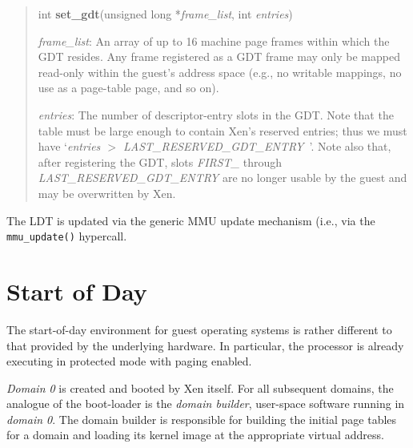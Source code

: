 \begin{quote}
  int {\bf set\_gdt}(unsigned long *{\em frame\_list}, int {\em
    entries})

  \emph{frame\_list}: An array of up to 16 machine page frames within
  which the GDT resides.  Any frame registered as a GDT frame may only
  be mapped read-only within the guest's address space (e.g., no
  writable mappings, no use as a page-table page, and so on).

  \emph{entries}: The number of descriptor-entry slots in the GDT.
  Note that the table must be large enough to contain Xen's reserved
  entries; thus we must have `{\em entries $>$
    LAST\_RESERVED\_GDT\_ENTRY}\ '.  Note also that, after registering
  the GDT, slots \emph{FIRST\_} through
  \emph{LAST\_RESERVED\_GDT\_ENTRY} are no longer usable by the guest
  and may be overwritten by Xen.
\end{quote}

The LDT is updated via the generic MMU update mechanism (i.e., via the
{\tt mmu\_update()} hypercall.

\section{Start of Day}

The start-of-day environment for guest operating systems is rather
different to that provided by the underlying hardware. In particular,
the processor is already executing in protected mode with paging
enabled.

{\it Domain 0} is created and booted by Xen itself. For all subsequent
domains, the analogue of the boot-loader is the {\it domain builder},
user-space software running in {\it domain 0}. The domain builder is
responsible for building the initial page tables for a domain and
loading its kernel image at the appropriate virtual address.
